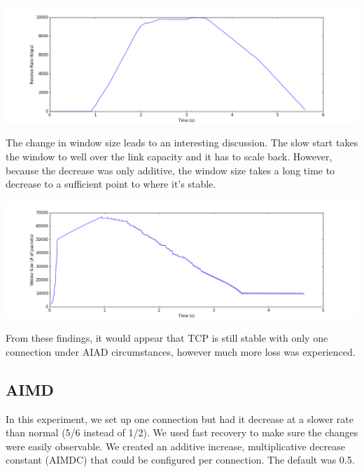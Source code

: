 \documentclass[11pt]{article}
\begin{document}
\vspace{5mm}

\includegraphics[width=17cm]{charts/advanced/aiad/rateTime1.png}

\vspace{5mm}

The change in window size leads to an interesting discussion. The slow start takes the window to well over the link capacity and it has to scale back. However, because the decrease was only additive, the window size takes a long time to decrease to a sufficient point to where it's stable.

\vspace{5mm}

\includegraphics[width=17cm]{charts/advanced/aiad/windowSize1.png}

\vspace{5mm}

From these findings, it would appear that TCP is still stable with only one connection under AIAD circumstances, however much more loss was experienced.

\subsection{AIMD}

In this experiment, we set up one connection but had it decrease at a slower rate than normal (5/6 instead of 1/2). We used fast recovery to make sure the changes were easily observable. We created an additive increase, multiplicative decrease constant (AIMDC) that could be configured per connection. The default was 0.5.
\end{document}
